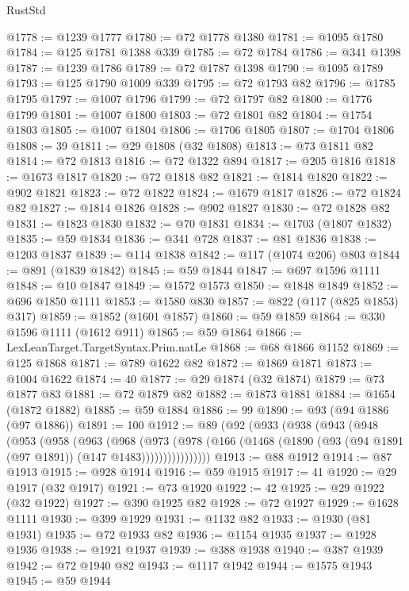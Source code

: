 \begin{lexlean}{RustStd}
\begin{coremodule}
@1778 := @1239 @1777
@1780 := @72 @1778 @1380
@1781 := @1095 @1780
@1784 := @125 @1781 @1388 @339
@1785 := @72 @1784
@1786 := @341 @1398
@1787 := @1239 @1786
@1789 := @72 @1787 @1398
@1790 := @1095 @1789
@1793 := @125 @1790 @1009 @339
@1795 := @72 @1793 @82
@1796 := @1785 @1795
@1797 := @1007 @1796
@1799 := @72 @1797 @82
@1800 := @1776 @1799
@1801 := @1007 @1800
@1803 := @72 @1801 @82
@1804 := @1754 @1803
@1805 := @1007 @1804
@1806 := @1706 @1805
@1807 := @1704 @1806
@1808 := 39
@1811 := @29 @1808 (@32 @1808)
@1813 := @73 @1811 @82
@1814 := @72 @1813
@1816 := @72 @1322 @894
@1817 := @205 @1816
@1818 := @1673 @1817
@1820 := @72 @1818 @82
@1821 := @1814 @1820
@1822 := @902 @1821
@1823 := @72 @1822
@1824 := @1679 @1817
@1826 := @72 @1824 @82
@1827 := @1814 @1826
@1828 := @902 @1827
@1830 := @72 @1828 @82
@1831 := @1823 @1830
@1832 := @70 @1831
@1834 := @1703 (@1807 @1832)
@1835 := @59 @1834
@1836 := @341 @728
@1837 := @81 @1836
@1838 := @1203 @1837
@1839 := @114 @1838
@1842 := @117 (@1074 @206) @803
@1844 := @891 (@1839 @1842)
@1845 := @59 @1844
@1847 := @697 @1596 @1111
@1848 := @10 @1847
@1849 := @1572 @1573
@1850 := @1848 @1849
@1852 := @696 @1850 @1111
@1853 := @1580 @830
@1857 := @822 (@117 (@825 @1853) @317)
@1859 := @1852 (@1601 @1857)
@1860 := @59 @1859
@1864 := @330 @1596 @1111 (@1612 @911)
@1865 := @59 @1864
@1866 := LexLeanTarget.TargetSyntax.Prim.natLe
@1868 := @68 @1866 @1152
@1869 := @125 @1868
@1871 := @789 @1622 @82
@1872 := @1869 @1871
@1873 := @1004 @1622
@1874 := 40
@1877 := @29 @1874 (@32 @1874)
@1879 := @73 @1877 @83
@1881 := @72 @1879 @82
@1882 := @1873 @1881
@1884 := @1654 (@1872 @1882)
@1885 := @59 @1884
@1886 := 99
@1890 := @93 (@94 @1886 (@97 @1886))
@1891 := 100
@1912 := @89
    (@92
      (@933
        (@938
          (@943
            (@948
              (@953
                (@958
                  (@963
                    (@968
                      (@973
                        (@978
                          (@166
                            (@1468 (@1890 (@93 (@94 @1891 (@97 @1891)) (@147 @1483))))))))))))))))
@1913 := @88 @1912
@1914 := @87 @1913
@1915 := @928 @1914
@1916 := @59 @1915
@1917 := 41
@1920 := @29 @1917 (@32 @1917)
@1921 := @73 @1920
@1922 := 42
@1925 := @29 @1922 (@32 @1922)
@1927 := @390 @1925 @82
@1928 := @72 @1927
@1929 := @1628 @1111
@1930 := @399 @1929
@1931 := @1132 @82
@1933 := @1930 (@81 @1931)
@1935 := @72 @1933 @82
@1936 := @1154 @1935
@1937 := @1928 @1936
@1938 := @1921 @1937
@1939 := @388 @1938
@1940 := @387 @1939
@1942 := @72 @1940 @82
@1943 := @1117 @1942
@1944 := @1575 @1943
@1945 := @59 @1944

\end{coremodule}
\end{lexlean}
